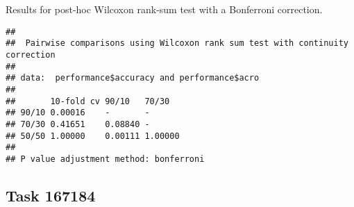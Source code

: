 \documentclass[
]{book}
\newenvironment{Shaded}{\begin{snugshade}}{\end{snugshade}}
\newcommand{\AttributeTok}[1]{\textcolor[rgb]{0.13,0.29,0.53}{#1}}
\newcommand{\ConstantTok}[1]{\textcolor[rgb]{0.56,0.35,0.01}{#1}}
\newcommand{\FunctionTok}[1]{\textcolor[rgb]{0.13,0.29,0.53}{\textbf{#1}}}
\newcommand{\NormalTok}[1]{#1}
\newcommand{\SpecialCharTok}[1]{\textcolor[rgb]{0.81,0.36,0.00}{\textbf{#1}}}
\newcommand{\StringTok}[1]{\textcolor[rgb]{0.31,0.60,0.02}{#1}}
\begin{document}
Results for post-hoc Wilcoxon rank-sum test with a Bonferroni correction.

\begin{Shaded}
\end{Shaded}

\begin{verbatim}
## 
##  Pairwise comparisons using Wilcoxon rank sum test with continuity correction 
## 
## data:  performance$accuracy and performance$acro 
## 
##       10-fold cv 90/10   70/30  
## 90/10 0.00016    -       -      
## 70/30 0.41651    0.08840 -      
## 50/50 1.00000    0.00111 1.00000
## 
## P value adjustment method: bonferroni
\end{verbatim}

\hypertarget{task-167184}{%
\subsection{Task 167184}\label{task-167184}}
\end{document}
